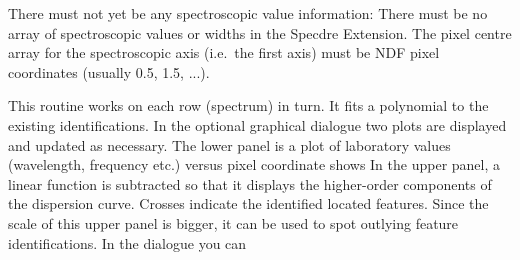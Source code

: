 {{      There must not yet be any spectroscopic value information: There
      must be no array of spectroscopic values or widths in the Specdre
      Extension. The pixel centre array for the spectroscopic axis
      (i.e.\ the first axis) must be NDF pixel coordinates (usually 0.5,
      1.5, ...).

      This routine works on each row (spectrum) in turn. It fits a
      polynomial to the existing identifications. In the optional
      graphical dialogue two plots are displayed and updated as
      necessary. The lower panel is a plot of laboratory values
      (wavelength, frequency etc.) versus pixel coordinate shows
      In the upper panel, a linear function is subtracted so that it
      displays the higher-order components of the dispersion curve.
      Crosses indicate the identified located features. Since the scale
      of this upper panel is bigger, it can be used to spot outlying
      feature identifications. In the dialogue you can
      }}
